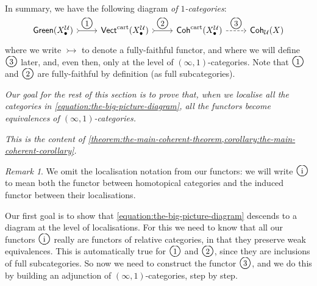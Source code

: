 \documentclass[11pt,fleqn]{article}
\theoremstyle{plain}
\theoremstyle{definition}
\theoremstyle{remark}
\newtheorem{remark}[theorem]{Remark}
\numberwithin{equation}{theorem}
\newcommand{\cover}{\mathcal{U}}
\newcommand{\gcohUX}{\mathsf{Coh}_{\cover}(X)}
\newcommand{\cartvectX}{\mathsf{Vect}^\mathrm{cart}(X_\bullet^\cover)}
\newcommand{\cartcohX}{\mathsf{Coh}^\mathrm{cart}(X_\bullet^\cover)}
\newcommand{\greenX}{\mathsf{Green}(X_\bullet^\cover)}
\newcommand{\numberincircle}[1]{\text{\normalfont\Large\textcircled{\small #1}}}
\begin{document}
        In summary, we have the following diagram \emph{of $1$-categories}:
        \begin{equation}
        \label{equation:the-big-picture-diagram}
            \begin{tikzcd}[row sep=huge]
                \greenX
                    \ar[r,tail,"\numberincircle{1}"]
                & \cartvectX
                    \ar[r,tail,"\numberincircle{2}"]
                & \cartcohX
                    \ar[r,dashed,"\numberincircle{3}"]
                & \gcohUX
            \end{tikzcd}
        \end{equation}
        where we write $\rightarrowtail$ to denote a fully-faithful functor, and where we will define $\numberincircle{3}$ later, and, even then, only at the level of $(\infty,1)$-categories.
        Note that $\numberincircle{1}$ and $\numberincircle{2}$ are fully-faithful by definition (as full subcategories).

        \bigskip

        \begin{center}
            \emph{Our goal for the rest of this section is to prove that, when we localise all the categories in \cref{equation:the-big-picture-diagram}, all the functors become equivalences of $(\infty,1)$-categories.}

            \emph{This is the content of \cref{theorem:the-main-coherent-theorem,corollary:the-main-coherent-corollary}.}
        \end{center}

        \medskip

        \begin{remark}
            We omit the localisation notation from our functors: we will write $\numberincircle{i}$ to mean both the functor between homotopical categories and the induced functor between their localisations.
        \end{remark}
        
        Our first goal is to show that \cref{equation:the-big-picture-diagram} descends to a diagram at the level of localisations.
        For this we need to know that all our functors $\numberincircle{i}$ really are functors of relative categories, in that they preserve weak equivalences.
        This is automatically true for $\numberincircle{1}$ and $\numberincircle{2}$, since they are inclusions of full subcategories.
        So now we need to construct the functor $\numberincircle{3}$, and we do this by building an adjunction of $(\infty,1)$-categories, step by step.
\end{document}
